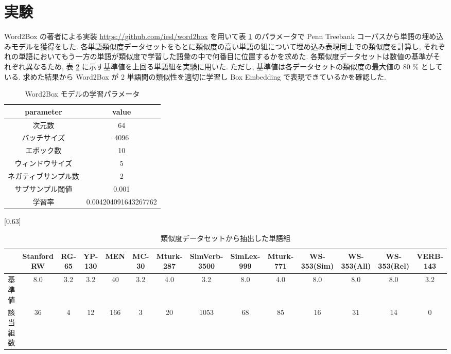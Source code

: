 \documentclass[twocolumn]{jarticle}     %
\begin{document}
\section{実験}
Word2Box の著者による実装 \url{https://github.com/iesl/word2box} を用いて表 \ref{tb:model_parameter} のパラメータで Penn Treebank コーパスから単語の埋め込みモデルを獲得をした. 
各単語類似度データセットをもとに類似度の高い単語の組について埋め込み表現同士での類似度を計算し, それぞれの単語においてもう一方の単語が類似度で学習した語彙の中で何番目に位置するかを求めた. 
各類似度データセットは数値の基準がそれぞれ異なるため, 表 \ref{tb:dataset_detail} に示す基準値を上回る単語組を実験に用いた. 
ただし, 基準値は各データセットの類似度の最大値の 80 \% としている. 
求めた結果から Word2Box が 2 単語間の類似性を適切に学習し Box Embedding で表現できているかを確認した. 

\begin{table}[th]
  \centering
  \caption{Word2Box モデルの学習パラメータ}
  \label{tb:model_parameter}
  \begin{tabular}{c|c} \hline
      parameter&value \\ \hline
      次元数&64 \\
      バッチサイズ&4096 \\ 
      エポック数&10 \\
      ウィンドウサイズ&5 \\
      ネガティブサンプル数&2 \\
      サブサンプル閾値&0.001 \\
      学習率&0.004204091643267762 \\
      \hline
  \end{tabular}
\end{table}

\begin{table}[th]
  \centering
  \caption{類似度データセットから抽出した単語組}
  \label{tb:dataset_detail}
  \scalebox{0.63}[0.63]{
		\begin{tabular}{c|ccccccccccccc}
			\hline
			
      & Stanford RW & RG-65 & YP-130 & MEN & MC-30 & Mturk-287 & SimVerb-3500 & SimLex-999 & Mturk-771 & WS-353(Sim) & WS-353(All) & WS-353(Rel) & VERB-143 \\ \hline
			基準値  & 8.0         & 3.2   & 3.2    & 40  & 3.2   & 4.0       & 3.2          & 8.0        & 4.0       & 8.0         & 8.0         & 8.0         & 3.2      \\
			該当組数 & 36          & 4     & 12     & 166 & 3     & 20        & 1053         & 68         & 85        & 16          & 31          & 14          & 0        \\ \hline
			\end{tabular}
  }
\end{table}
\end{document}
